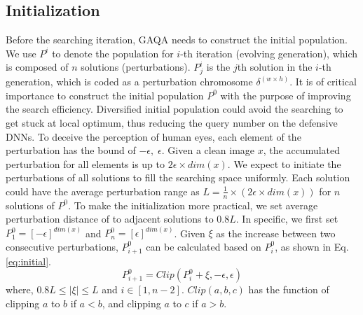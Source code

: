 \documentclass[lettersize,journal]{IEEEtran}
\begin{document}
	\subsection{Initialization}
	Before the searching iteration, GAQA needs to construct the initial population. We use $P^i$ to denote the population for $i$-th iteration (evolving generation), which is composed of $n$ solutions (perturbations). $P^i_j$ is the $j$th solution in the $i$-th generation, which is coded as a perturbation chromosome $\delta^{( w \times h)}$. It is of critical importance to construct the initial population $P^0$ with the purpose of improving the search efficiency. Diversified initial population could avoid the searching to get stuck at local optimum, thus reducing the query number on the defensive DNNs. To deceive the perception of human eyes, each element of the perturbation has the bound of $-\epsilon,\; \epsilon$. Given a clean image $x$, the accumulated perturbation for all elements is up to $2\epsilon \times dim(x)$. We expect to initiate the perturbations of all solutions to fill the searching space uniformly. Each solution could have the average perturbation range as $L= \frac{1}{n} \times (2\epsilon \times dim(x))$ for $n$ solutions of $P^0$. To make the initialization more practical, we set average perturbation distance of to adjacent solutions to $0.8L$. In specific, we first set $P^0_1=[-\epsilon]^{dim(x)}$ and $P^0_n=[\epsilon]^{dim(x)}$. Given $\xi$ as the increase between two consecutive perturbations, $P^0_{i+1}$ can be calculated based on $P^0_{i}$, as shown in Eq. \ref{eq:initial}.
	\begin{equation}
		\label{eq:initial}
		P^0_{i+1}=Clip(P^0_i+\xi,-\epsilon,\epsilon) 
	\end{equation}
	where, $0.8L\leq|\xi|\leq L$ and $i \in[1,n-2]$. $Clip(a, b, c)$ has the function of clipping $a$ to $b$ if $a < b$, and clipping $a$ to $c$ if $a > b$.
	
	
\end{document}
